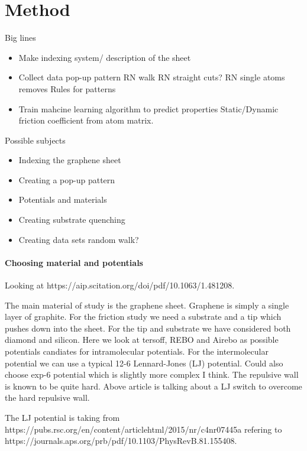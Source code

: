 \newpage
\chapter*{Method}

Big lines
\begin{itemize}
    \item Make indexing system/ description of the sheet 
    \item Collect data 
    \subitem pop-up pattern
    \subitem RN walk 
    \subitem RN straight cuts?
    \subitem RN single atoms removes
    \subitem Rules for patterns
    \item Train mahcine learning algorithm to predict properties
    \subitem Static/Dynamic friction coefficient from atom matrix. 
\end{itemize}    


Possible subjects
\begin{itemize}
    \item Indexing the graphene sheet
    \item Creating a pop-up pattern
    \item Potentials and materials
    \item Creating substrate
    \subitem quenching
    \item Creating data sets
    \subitem random walk?
\end{itemize}    




\subsubsection*{Choosing material and potentials}

Looking at https://aip.scitation.org/doi/pdf/10.1063/1.481208.

The main material of study is the graphene sheet. Graphene is simply a single layer of graphite. For the friction study we need a substrate and a tip which pushes down into the sheet. For the tip and substrate we have considered both diamond and silicon. Here we look at tersoff, REBO and Airebo as possible potentials candiates for intramolecular potentials. For the intermolecular potential we can use a typical 12-6 Lennard-Jones (LJ) potential. Could also choose exp-6 potential which is slightly more complex I think. The repulsive wall is known to be quite hard. Above article is talking about a LJ switch to overcome the hard repulsive wall.  


The LJ potential is taking from https://pubs.rsc.org/en/content/articlehtml/2015/nr/c4nr07445a refering to https://journals.aps.org/prb/pdf/10.1103/PhysRevB.81.155408.



